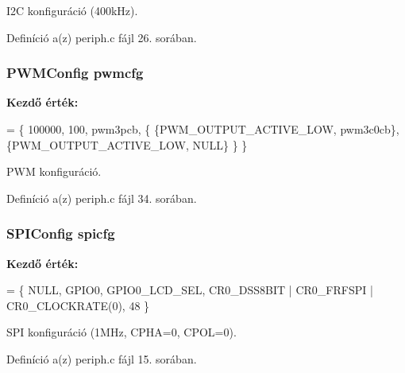 I2\-C konfiguráció (400k\-Hz). 



Definíció a(z) periph.\-c fájl 26. sorában.

\subsubsection[{pwmcfg}]{\setlength{\rightskip}{0pt plus 5cm}P\-W\-M\-Config pwmcfg}\label{periph_8c_a902ad52cd507aae1615bd2858a47020d}
{\bfseries Kezdő érték\-:}
\begin{DoxyCode}
= \{
    100000,                          
       100,                          
    pwm3pcb,                         
    \{
        \{PWM\_OUTPUT\_ACTIVE\_LOW, pwm3c0cb\},
        \{PWM\_OUTPUT\_ACTIVE\_LOW, NULL\}
    \}
\}
\end{DoxyCode}


P\-W\-M konfiguráció. 



Definíció a(z) periph.\-c fájl 34. sorában.

\subsubsection[{spicfg}]{\setlength{\rightskip}{0pt plus 5cm}S\-P\-I\-Config spicfg}\label{periph_8c_afc4986c4ff59c9cd490bd7fd437f7c1a}
{\bfseries Kezdő érték\-:}
\begin{DoxyCode}
= \{
  NULL,
  GPIO0,
  GPIO0\_LCD\_SEL, 
  CR0\_DSS8BIT | CR0\_FRFSPI | CR0\_CLOCKRATE(0),
  48
\}
\end{DoxyCode}


S\-P\-I konfiguráció (1\-M\-Hz, C\-P\-H\-A=0, C\-P\-O\-L=0). 



Definíció a(z) periph.\-c fájl 15. sorában.

